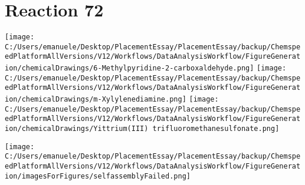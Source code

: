 \documentclass{article}%
\begin{document}
\section*{Reaction 72}%
%
\begin{scheme}[H]%
\begin{minipage}{0.5\textwidth}%
\texttt{[image: C:/Users/emanuele/Desktop/PlacementEssay/PlacementEssay/backup/ChemspeedPlatformAllVersions/V12/Workflows/DataAnalysisWorkflow/FigureGeneration/chemicalDrawings/6-Methylpyridine-2-carboxaldehyde.png]}%
\texttt{[image: C:/Users/emanuele/Desktop/PlacementEssay/PlacementEssay/backup/ChemspeedPlatformAllVersions/V12/Workflows/DataAnalysisWorkflow/FigureGeneration/chemicalDrawings/m-Xylylenediamine.png]}%
\texttt{[image: C:/Users/emanuele/Desktop/PlacementEssay/PlacementEssay/backup/ChemspeedPlatformAllVersions/V12/Workflows/DataAnalysisWorkflow/FigureGeneration/chemicalDrawings/Yittrium(III) trifluoromethanesulfonate.png]}%
\end{minipage}%
\begin{minipage}{0.5\textwidth}%
\begin{center}%
\texttt{[image: C:/Users/emanuele/Desktop/PlacementEssay/PlacementEssay/backup/ChemspeedPlatformAllVersions/V12/Workflows/DataAnalysisWorkflow/FigureGeneration/imagesForFigures/selfassemblyFailed.png]}%
\end{center}%
\end{minipage}%
\caption{Self-assembly of components 8, 18, with Yittrium(III) in a 3.0:1.5:1.0 molar ratio in CH$_3$CN at 60\textdegree C for 40h. These are the reagents (starting materials) for reaction 72.}%
\end{scheme}%
\end{document}
